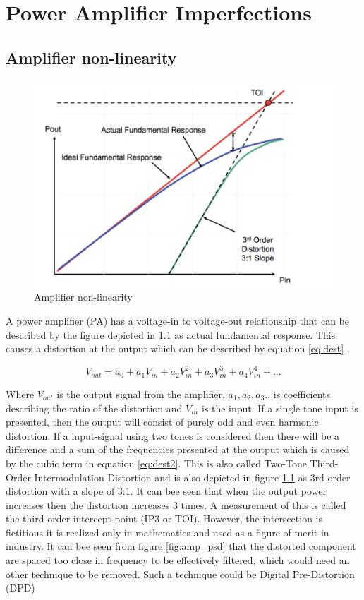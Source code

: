 \chapter{Power Amplifier Imperfections}\label{ch:1}

\section{Amplifier non-linearity}

\begin{figure}[H]
\centering 
\includegraphics[scale = 0.4]{figures/ch1/amp_lin.png}
\caption{Amplifier non-linearity \citep{NI}}
\label{fig:amp_lin}
\end{figure} 

A power amplifier (PA) has a voltage-in to voltage-out relationship that can be described by the figure depicted in \ref{fig:amp_lin} as actual fundamental response. This causes a distortion at the output which can be described by equation \ref{eq:dest} \citep{NI}. 

\begin{equation} \label{eq:dest}
V_{out} = a_0 + a_1 V_{in} + a_2 V_{in}^2 + a_3 V_{in}^3 + a_4 V_{in}^4 + ... 
\end{equation}

Where $V_{out}$ is the output signal from the amplifier, $a_1, a_2 ,a_3..$ is coefficients describing the ratio of the distortion and $V_{in}$ is the input. If a single tone input is presented, then the output will consist of purely odd and even harmonic distortion. If a input-signal using two tones is considered then there will be a difference and a sum of the frequencies presented at the output which is caused by the cubic term in equation \ref{eq:dest2}. This is also called Two-Tone Third-Order Intermodulation Distortion and is also depicted in figure \ref{fig:amp_lin} as 3rd order distortion with a slope of 3:1. It can bee seen that when the output power increases then the distortion increases 3 times. A measurement of this is called the third-order-intercept-point (IP3 or TOI). However, the intersection is fictitious it is realized only in
mathematics and used as a figure of merit in industry. It can bee seen from figure \ref{fig:amp_psd} that the distorted component are spaced too close in frequency to be effectively filtered, which would need an other technique to be removed. Such a technique could be Digital Pre-Distortion (DPD)  

